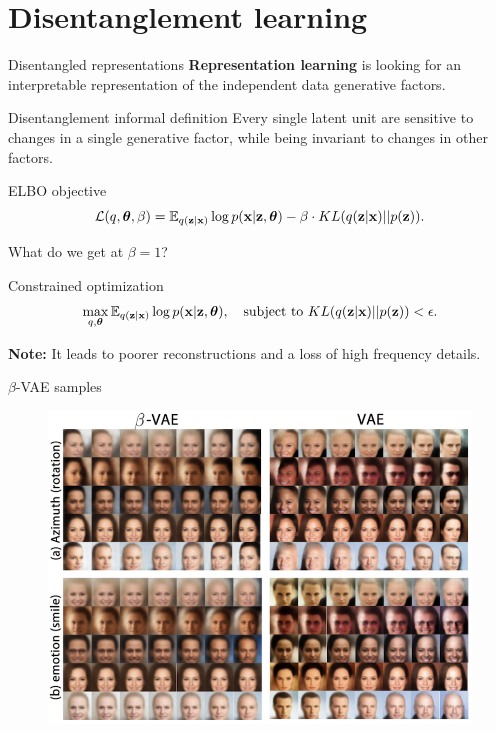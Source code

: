 \section{Disentanglement learning}
\begin{frame}{Disentangled representations}
	\vspace{-0.2cm}
	\textbf{Representation learning} is looking for an interpretable representation of the independent data generative factors. 
	\begin{block}{Disentanglement informal definition}
		Every single latent unit are sensitive to changes in a single generative factor, while being invariant to changes in other factors. 
	\end{block}
	\vspace{-0.2cm}
	\begin{block}{ELBO objective}
	\vspace{-0.2cm}
	\[
	    \mathcal{L}(q, \boldsymbol{\theta}, \beta) = \mathbb{E}_{q(\mathbf{z} | \mathbf{x})} \log p(\mathbf{x} | \mathbf{z}, \boldsymbol{\theta}) - \beta \cdot KL (q(\mathbf{z} | \mathbf{x}) || p(\mathbf{z})).
	\]
	\vspace{-0.5cm}
	\end{block}
	What do we get at $\beta = 1$? \\
	\begin{block}{Constrained optimization}
		\vspace{-0.7cm}
		\[
			\max_{q, \boldsymbol{\theta}} \mathbb{E}_{q(\mathbf{z} | \mathbf{x})} \log p(\mathbf{x} | \mathbf{z}, \boldsymbol{\theta}), \quad \text{subject to } KL (q(\mathbf{z} | \mathbf{x}) || p(\mathbf{z})) < \epsilon.
		\]
		\vspace{-0.7cm}
	\end{block}
	\textbf{Note:} It leads to poorer reconstructions and a loss of high frequency details. 
\end{frame}
\begin{frame}{$\beta$-VAE samples}
	\begin{figure}
	    \centering
	    \includegraphics[width=0.9\linewidth]{figs/betaVAE_1.png}
	\end{figure}

\end{frame}

